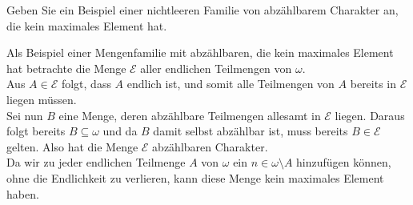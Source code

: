
\begin{exercise}[279]

Geben Sie ein Beispiel einer nichtleeren Familie von abzählbarem Charakter an,
die kein maximales Element hat.

\end{exercise}


\begin{solution}

Als Beispiel einer Mengenfamilie mit abzählbaren, die kein maximales
Element hat betrachte die Menge $\mathcal{E}$ aller endlichen Teilmengen von $\omega$. \\
Aus $A \in \mathcal{E}$ folgt, dass $A$ endlich ist, und somit alle Teilmengen
von $A$ bereits in $\mathcal{E}$ liegen müssen. \\
Sei nun $B$ eine Menge, deren abzählbare Teilmengen allesamt in $\mathcal{E}$
liegen. Daraus folgt bereits $B \subseteq \omega$ und da $B$ damit selbst abzählbar ist,
muss bereits $B \in \mathcal{E}$ gelten. Also hat die Menge $\mathcal{E}$ abzählbaren
Charakter. \\
Da wir zu jeder endlichen Teilmenge $A$ von $\omega$ ein $n \in \omega \setminus A$
hinzufügen können, ohne die Endlichkeit zu verlieren, kann diese Menge kein
maximales Element haben.

\end{solution}

